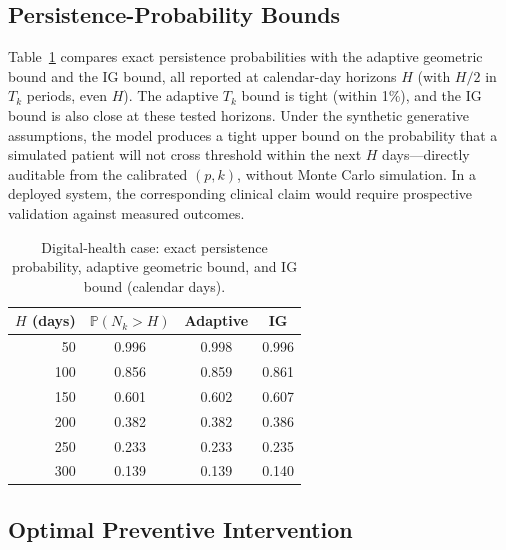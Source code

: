 \documentclass[pdflatex,sn-mathphys-num]{sn-jnl}
\theoremstyle{definition}
\newcommand{\Prob}{\mathbb{P}}
\numberwithin{equation}{section}
\begin{document}
\subsection{Persistence-Probability Bounds}

Table~\ref{tab:case_pdi} compares exact persistence probabilities with the adaptive geometric bound and the IG bound, all reported at calendar-day horizons $H$ (with $H/2$ in $T_k$ periods, even $H$). The adaptive $T_k$ bound is tight (within 1\%), and the IG bound is also close at these tested horizons. Under the synthetic generative assumptions, the model produces a tight upper bound on the probability that a simulated patient will not cross threshold within the next $H$ days---directly auditable from the calibrated $(p,k)$, without Monte Carlo simulation. In a deployed system, the corresponding clinical claim would require prospective validation against measured outcomes.

\begin{table}[htbp]
\centering
\caption{Digital-health case: exact persistence probability, adaptive geometric bound, and IG bound (calendar days).}
\label{tab:case_pdi}
\small
\begin{tabular}{rccc}
\toprule
$H$ (days) & $\Prob(N_k>H)$ & Adaptive & IG \\
\midrule
50 & 0.996 & 0.998 & 0.996 \\
100 & 0.856 & 0.859 & 0.861 \\
150 & 0.601 & 0.602 & 0.607 \\
200 & 0.382 & 0.382 & 0.386 \\
250 & 0.233 & 0.233 & 0.235 \\
300 & 0.139 & 0.139 & 0.140 \\
\bottomrule
\end{tabular}
\end{table}

\subsection{Optimal Preventive Intervention}
\end{document}
